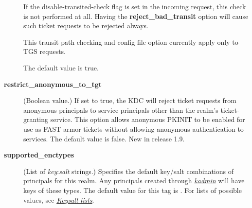 \documentclass[letterpaper,10pt,english]{sphinxmanual}
\begin{document}
\begin{description}
If the disable-transited-check flag is set in the incoming
request, this check is not performed at all.  Having the
\textbf{reject\_bad\_transit} option will cause such ticket requests to
be rejected always.

This transit path checking and config file option currently apply
only to TGS requests.

The default value is true.

\item[{\textbf{restrict\_anonymous\_to\_tgt}}] \leavevmode
(Boolean value.)  If set to true, the KDC will reject ticket
requests from anonymous principals to service principals other
than the realm's ticket-granting service.  This option allows
anonymous PKINIT to be enabled for use as FAST armor tickets
without allowing anonymous authentication to services.  The
default value is false.  New in release 1.9.

\item[{\textbf{supported\_enctypes}}] \leavevmode
(List of \emph{key}:\emph{salt} strings.)  Specifies the default key/salt
combinations of principals for this realm.  Any principals created
through {\hyperref[admin/admin_commands/kadmin_local:kadmin-1]{\emph{kadmin}}} will have keys of these types.  The
default value for this tag is .  For lists of
possible values, see {\hyperref[admin/conf_files/kdc_conf:keysalt-lists]{\emph{Keysalt lists}}}.

\end{description}
\end{document}
